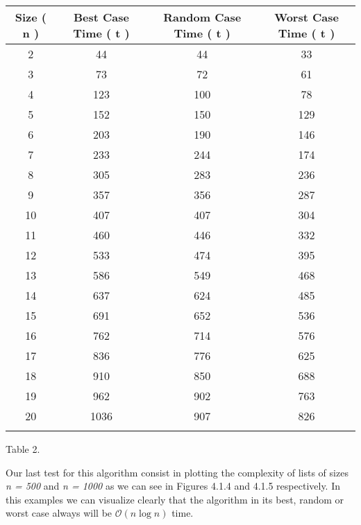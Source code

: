 {\small
\begin{center} 
\begin{tabular}[.5cm]{ c c c c } 
\toprule 
\hspace {5px} Size ( n ) \hspace {5px} & \hspace {15px} Best Case Time ( t ) \hspace {15px} & \hspace {15px} Random Case Time ( t ) \hspace {15px} & \hspace {15px} Worst Case Time ( t ) \hspace {15px} \\ \midrule 
2 & 44 & 44 & 33 \\ 
\cmidrule {1-4} 
3 & 73 & 72 & 61 \\ 
\cmidrule {1-4} 
4 & 123 & 100 & 78 \\ 
\cmidrule {1-4} 
5 & 152 & 150 & 129 \\ 
\cmidrule {1-4} 
6 & 203 & 190 & 146 \\ 
\cmidrule {1-4} 
7 & 233 & 244 & 174 \\ 
\cmidrule {1-4} 
8 & 305 & 283 & 236 \\ 
\cmidrule {1-4} 
9 & 357 & 356 & 287 \\ 
\cmidrule {1-4} 
10 & 407 & 407 & 304 \\ 
\cmidrule {1-4} 
11 & 460 & 446 & 332 \\ 
\cmidrule {1-4} 
12 & 533 & 474 & 395 \\ 
\cmidrule {1-4} 
13 & 586 & 549 & 468 \\ 
\cmidrule {1-4} 
14 & 637 & 624 & 485 \\ 
\cmidrule {1-4} 
15 & 691 & 652 & 536 \\ 
\cmidrule {1-4} 
16 & 762 & 714 & 576 \\ 
\cmidrule {1-4} 
17 & 836 & 776 & 625 \\ 
\cmidrule {1-4} 
18 & 910 & 850 & 688 \\ 
\cmidrule {1-4} 
19 & 962 & 902 & 763 \\ 
\cmidrule {1-4} 
20 & 1036 & 907 & 826 \\ 
\bottomrule 
\linebreak 
\end{tabular} 
\linebreak \linebreak Table 2.
\end{center}}

\pagebreak

Our last test for this algorithm consist in plotting the complexity of lists of sizes {\itshape n = 500} and {\itshape n = 1000} as we can see in Figures 4.1.4 and 4.1.5 respectively. In this examples we can visualize clearly that the algorithm in its best, random or worst case always will be {\bfseries $\mathcal{O}(n\log{}n)$} time. \hfill \break

